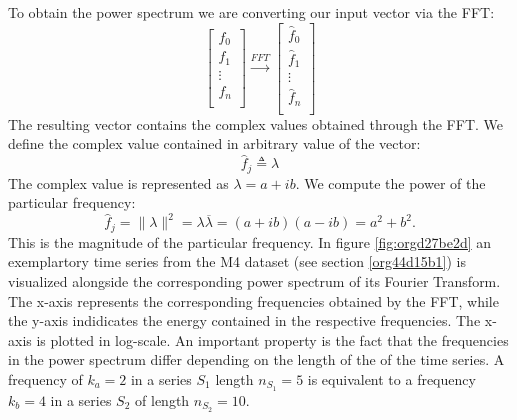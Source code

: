\documentclass[phd,black, hidelinks]{PrincetonThesis}
\newcommand{\compconj}[1]{\overline{#1}}
\begin{document}
To obtain the power spectrum we are converting our input vector via the FFT:
\begin{equation}
\begin{bmatrix}
f_0 \\
f_1 \\
\vdots \\
f_n \\
\end{bmatrix}
\xrightarrow{FFT}
\begin{bmatrix}
\hat{f}_0 \\
\hat{f}_1 \\
\vdots \\
\hat{f}_n \\
\end{bmatrix}
\end{equation}
The resulting vector contains the complex values obtained through the FFT. We define the complex value contained in arbitrary value of the vector:
\begin{equation}
\hat{f}_j \triangleq \lambda
\end{equation}
The complex value is represented as \(\lambda = a + ib\). We compute the power of the particular frequency:
\begin{equation}
\hat{f}_j = \lVert\lambda \rVert^2= \lambda \compconj{\lambda} = (a + ib)(a - ib) = a^2 + b^2.
\end{equation}
This is the magnitude of the particular frequency. In figure \ref{fig:orgd27be2d} an exemplartory time series from the M4 dataset (see section \ref{org44d15b1}) is visualized alongside the corresponding power spectrum of its Fourier Transform. The x-axis represents the corresponding frequencies obtained by the FFT, while the y-axis indidicates the energy contained in the respective frequencies. The x-axis is plotted in log-scale. An important property is the fact that the frequencies in the power spectrum differ depending on the length of the of the time series. A frequency of \(k_a=2\) in a series \(S_1\) length \(n_{S_1}=5\) is equivalent to a frequency \(k_b=4\) in a series \(S_2\) of length \(n_{S_2}= 10\).
\end{document}
